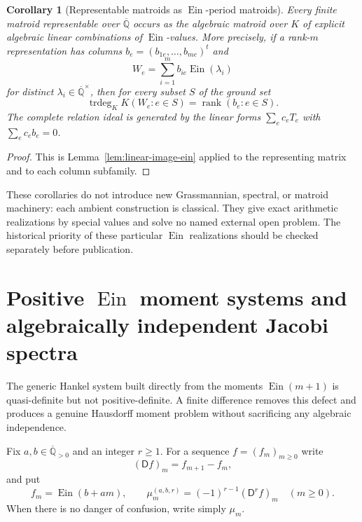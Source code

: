 \documentclass[11pt]{article}
\newtheorem{corollary}[theorem]{Corollary}
\theoremstyle{definition}
\theoremstyle{remark}
\newcommand{\Qbar}{\overline{\mathbb Q}}
\newcommand{\trdeg}{\operatorname{trdeg}}
\newcommand{\Ein}{\operatorname{Ein}}
\begin{document}
\begin{corollary}[Representable matroids as $\Ein$-period matroids]
\label{cor:ein-representable-matroid}
Every finite matroid representable over $\Qbar$ occurs as the algebraic
matroid over $K$ of explicit algebraic linear combinations of
$\Ein$-values.  More precisely, if a rank-$m$ representation has columns
$b_e=(b_{1e},\ldots,b_{me})^t$ and
\[
 W_e=\sum_{i=1}^m b_{ie}\Ein(\lambda_i)
\]
for distinct $\lambda_i\in\Qbar^\times$, then for every subset $S$ of the
ground set
\[
 \trdeg_K K(W_e:e\in S)=\operatorname{rank}(b_e:e\in S).
\]
The complete relation ideal is generated by the linear forms
$\sum_e c_eT_e$ with $\sum_e c_eb_e=0$.
\end{corollary}

\begin{proof}
This is Lemma~\ref{lem:linear-image-ein} applied to the representing
matrix and to each column subfamily.
\end{proof}

These corollaries do not introduce new Grassmannian, spectral, or matroid
machinery: each ambient construction is classical.  They give exact
arithmetic realizations by special values and solve no named external open
problem.  The historical priority of these particular $\Ein$ realizations
should be checked separately before publication.

\section{Positive \texorpdfstring{$\Ein$}{Ein} moment systems and
algebraically independent Jacobi spectra}
\label{sec:positive-ein-jacobi}

The generic Hankel system built directly from the moments
$\Ein(m+1)$ is quasi-definite but not positive-definite.  A finite
difference removes this defect and produces a genuine Hausdorff moment
problem without sacrificing any algebraic independence.

Fix $a,b\in\overline{\mathbb Q}_{>0}$ and an integer $r\geq1$.  For a
sequence $f=(f_m)_{m\geq0}$ write
\[
 (\mathsf Df)_m=f_{m+1}-f_m,
\]
and put
\begin{equation}\label{eq:positive-ein-moments}
 f_m=\Ein(b+am),\qquad
 \mu_m^{(a,b,r)}=(-1)^{r-1}(\mathsf D^rf)_m\quad(m\geq0).
\end{equation}
When there is no danger of confusion, write simply $\mu_m$.
\end{document}
